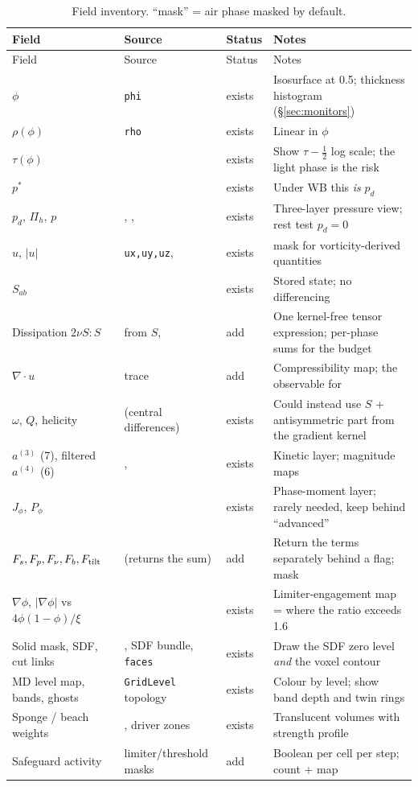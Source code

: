 \documentclass[11pt,a4paper]{article}
\newcommand{\ps}{p^\ast}
\newcommand{\pd}{p_d}
\newcommand{\Pih}{\Pi_h}
\newcommand{\code}[1]{\texttt{#1}}
\newcommand{\have}{\textcolor{green!45!black}{exists}}
\newcommand{\addme}{\textcolor{orange!80!black}{add}}
\begin{document}
\begin{longtable}{L{3.3cm}L{4.6cm}L{1.4cm}L{5.4cm}}
\caption{Field inventory. ``mask'' = air phase masked by default.}\\
\toprule
Field & Source & Status & Notes \\
\midrule
\endfirsthead
\toprule
Field & Source & Status & Notes \\
\midrule
\endhead
$\phi$ & \code{phi} & \have & Isosurface at 0.5; thickness histogram (\S\ref{sec:monitors}) \\
$\rho(\phi)$ & \code{rho} & \have & Linear in $\phi$ \\
$\tau(\phi)$ &  & \have & Show $\tau-\tfrac12$ log scale; the light phase is the risk \\
$\ps$ &  & \have & Under WB this \emph{is} $\pd$ \\
$\pd$, $\Pih$, $p$ & , ,  & \have & Three-layer pressure view; rest test $\pd=0$ \\
$u$, $|u|$ & \code{ux,uy,uz},  & \have & mask for vorticity-derived quantities \\
$S_{ab}$ &  & \have & Stored state; no differencing \\
Dissipation $2\nu S\!:\!S$ & from $S$,  & \addme & One kernel-free tensor expression; per-phase sums for the budget \\
$\nabla\cdot u$ &  trace & \addme & Compressibility map; the observable for  \\
$\omega$, $Q$, helicity &  (central differences) & \have & Could instead use $S$ + antisymmetric part from the gradient kernel \\
$a^{(3)}$ (7), filtered $a^{(4)}$ (6) & ,  & \have & Kinetic layer; magnitude maps \\
$J_\phi$, $P_\phi$ &  & \have & Phase-moment layer; rarely needed, keep behind ``advanced'' \\
$F_s, F_p, F_\nu, F_b, F_{\rm tilt}$ &  (returns the sum) & \addme & Return the terms separately behind a flag; mask \\
$\nabla\phi$, $|\nabla\phi|$ vs $4\phi(1-\phi)/\xi$ &  & \have & Limiter-engagement map = where the ratio exceeds 1.6 \\
Solid mask, SDF, cut links & , SDF bundle, \code{faces} & \have & Draw the SDF zero level \emph{and} the voxel contour \\
MD level map, bands, ghosts & \code{GridLevel} topology & \have & Colour by level; show band depth and twin rings \\
Sponge / beach weights & , driver zones & \have & Translucent volumes with strength profile \\
Safeguard activity & limiter/threshold masks & \addme & Boolean per cell per step; count + map \\
\bottomrule
\end{longtable}
\end{document}
